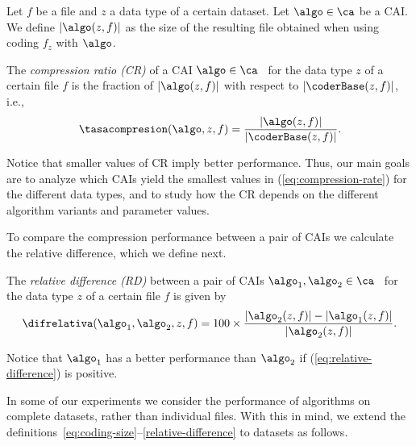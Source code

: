 \vspace{+2pt}
\begin{defcion}
\label{eq:coding-size}
Let $f$ be a file and $z$ a data type of a certain dataset. Let $\algo \in \ca$ be a CAI. We define $|\algo(z, f)|$ as the size of the resulting file obtained when using coding $f_z$ with $\algo$.
\end{defcion}


\vspace{+2pt}
\begin{defcion}
The \textit{compression ratio (CR)} of a CAI $\algo \in \ca$ \ for the data type $z$ of a certain file $f$ is the fraction of $|\algo(z, f)|$ with respect to $|\coderBase(z, f)|$, i.e.,
\vspace{-5pt}
\begin{equation}
\label{eq:compression-rate}
\tasacompresion(\algo, z, f) = \frac{|\algo(z, f)|}{|\coderBase(z, f)|}.
\end{equation}
\end{defcion}


Notice that smaller values of CR imply better performance. Thus, our main goals are to analyze which CAIs yield the smallest values in (\ref{eq:compression-rate}) for the different data types, and to study how the CR depends on the different algorithm variants and parameter values.


To compare the compression performance between a pair of CAIs we calculate the relative difference, which we define next.


\vspace{+5pt}
\begin{defcion}
\label{relative-difference}
The \textit{relative difference (RD)} between a pair of CAIs $\algo_1, \algo_2 \in {\ca}$ \ for the data type $z$ of a certain file $f$ is given by
\vspace{-5pt}
\begin{equation}
\label{eq:relative-difference}
\difrelativa(\algo_1, \algo_2, z, f)  =
100\times\frac{|\algo_2 (z, f)| - |\algo_1 (z, f)|}{ |\algo_2 (z, f)| }.
\end{equation}
\end{defcion}


Notice that $\algo_1$ has a better performance than $\algo_2$ if (\ref{eq:relative-difference}) is positive.


\vspace{+3pt}
In some of our experiments we consider the performance of algorithms on complete datasets, rather than individual files. With this in mind, we extend the definitions~\ref{eq:coding-size}--\ref{relative-difference} to datasets as follows.


